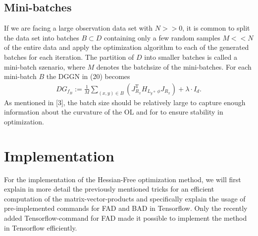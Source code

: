 \documentclass[conference]{IEEEtran}
\begin{document}
\subsection{Mini-batches}
\noindent
If we are facing a large observation data set with $N>>0$, it is common to split the data set into batches $B\subset D$ containing only a few random samples $M<<N$ of the entire data and apply the optimization algorithm to each of the generated batches for each iteration. The partition of $D$ into smaller batches is called a mini-batch szenario, where $M$ denotes the batchsize of the mini-batches. For each mini-batch $B$ the DGGN in (20) becomes
\begin{align}
DG_{f_{B}} := \frac{1}{M}\sum_{(x, y)\in B}^{}\left(J_{R_{x}}^{\mathrm{T}}H_{L_{y}\circ\:\phi}J_{R_{x}}\right) + \lambda\cdot I_{d}.
\end{align}
As mentioned in [3], the batch size should be relatively large to capture enough information about the curvature of the OL and for to ensure stability in optimization. 



\section {Implementation}
\noindent
For the implementation of the Hessian-Free optimization method, we will first explain in more detail the previously mentioned tricks for an efficient computation of the matrix-vector-products and specifically explain the usage of pre-implemented commands for FAD and BAD in Tensorflow. Only the recently added Tensorflow-command for FAD made it possible to implement the method in Tensorflow efficiently.
\end{document}
